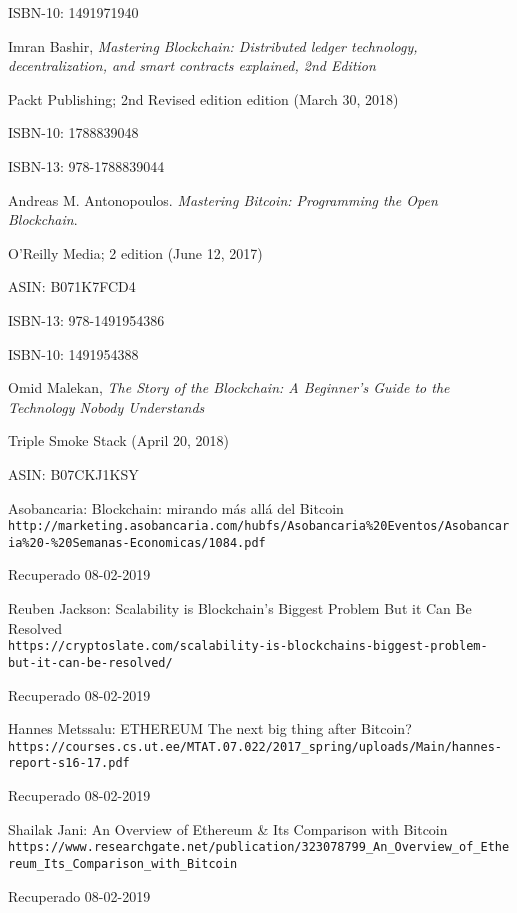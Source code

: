 \documentclass[a4paper,12pt,times,print,index]{Classes/PhDThesisPSnPDF}
\begin{document}
\begin{thebibliography}{40}
		ISBN-10: 1491971940
		
		Imran Bashir, \textit{Mastering Blockchain: Distributed ledger technology, decentralization, and smart contracts explained, 2nd Edition}
		
		Packt Publishing; 2nd Revised edition edition (March 30, 2018)
		
		ISBN-10: 1788839048
		
		ISBN-13: 978-1788839044
		
		Andreas M. Antonopoulos. \textit{Mastering Bitcoin: Programming the Open Blockchain}.
		
		O'Reilly Media; 2 edition (June 12, 2017)
		
		ASIN: B071K7FCD4
		
		ISBN-13: 978-1491954386
		
		ISBN-10: 1491954388
		
		Omid Malekan, \textit{The Story of the Blockchain: A Beginner's Guide to the Technology Nobody Understands}		
		
		Triple Smoke Stack (April 20, 2018)
		
		ASIN: B07CKJ1KSY
		
		Asobancaria: Blockchain: mirando más allá del Bitcoin
		\\\texttt{http://marketing.asobancaria.com/hubfs/Asobancaria\%20Eventos/Asobancaria\%20-\%20Semanas-Economicas/1084.pdf}
		
		Recuperado 08-02-2019
		
		Reuben Jackson: Scalability is Blockchain’s Biggest Problem But it Can Be Resolved
		\\\texttt{https://cryptoslate.com/scalability-is-blockchains-biggest-problem-but-it-can-be-resolved/}
		
		Recuperado 08-02-2019
		
		Hannes Metssalu: ETHEREUM The next big thing after Bitcoin?
		\\\texttt{https://courses.cs.ut.ee/MTAT.07.022/2017_spring/uploads/Main/hannes-report-s16-17.pdf}
		
		Recuperado 08-02-2019
		
		Shailak Jani: An Overview of Ethereum & Its Comparison with Bitcoin
		\\\texttt{https://www.researchgate.net/publication/323078799_An_Overview_of_Ethereum_Its_Comparison_with_Bitcoin}	
		
		Recuperado 08-02-2019
	
\end{thebibliography}
\end{document}
